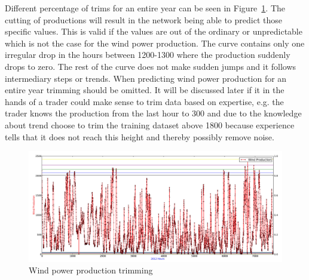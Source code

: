 Different percentage of trims for an entire year can be seen in Figure~\ref{fig:windProductionTrimming}. The cutting of productions will result in the network being able to predict those specific values. This is valid if the values are out of the ordinary or unpredictable which is not the case for the wind power production. The curve contains only one irregular drop in the hours between 1200-1300 where the production suddenly drops to zero. The rest of the curve does not make sudden jumps and it follows intermediary steps or trends. When predicting wind power production for an entire year trimming should be omitted. It will be discussed later if it in the hands of a trader could make sense to trim data based on expertise, e.g. the trader knows the production from the last hour to 300 and due to the knowledge about trend choose to trim the training dataset above 1800 because experience tells that it does not reach this height and thereby possibly remove noise.

\begin{figure}[H]
\centering
\includegraphics[width=0.99\linewidth,natwidth=898,natheight=587]{billeder/windProductionTrimming.jpg}
\caption{Wind power production trimming}
\label{fig:windProductionTrimming}
\end{figure}



